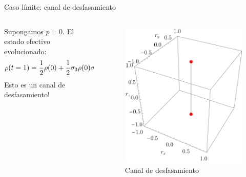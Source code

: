 \begin{frame}{Caso límite: canal de desfasamiento}
    \begin{columns}
        \begin{column}{0.5\textwidth}
            Supongamos $p=0$. El estado efectivo evolucionado:
            \begin{equation*}
              \rho(t=1)=\frac{1}{2}\rho(0)+\frac{1}{2}\sigma_{3}\rho(0)\sigma_{3}.
            \end{equation*}
            Esto es un canal de desfasamiento!
        \end{column}
        \begin{column}{0.5\textwidth}
            \begin{figure}[h!]
                \centering
                \includegraphics[width=0.7\linewidth]{figures/maxent_results/CNOT_p=1._t=1_r=0.9.png}
                \caption{Canal de desfasamiento}
              \end{figure}
        \end{column}
    \end{columns}
\end{frame}
